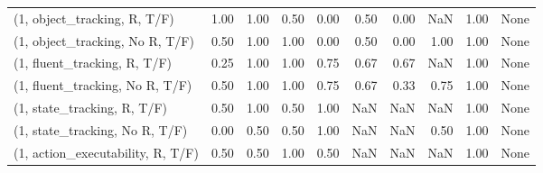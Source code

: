 \begin{table*}[h!]
\begin{adjustbox}{width=2\columnwidth,center}
\begin{tabular}{lrrr|rrr|rrr}
\midrule
(1, object\_tracking, R, T/F)         &                      1.00 &                  1.00 &                      0.50 &                          0.00 &                      0.50 &                          0.00 &                                    NaN &                               1.00 &                                  None \\
(1, object\_tracking, No R, T/F)      &                      0.50 &                  1.00 &                      1.00 &                          0.00 &                      0.50 &                          0.00 &                                   1.00 &                               1.00 &                                  None \\
(1, fluent\_tracking, R, T/F)         &                      0.25 &                  1.00 &                      1.00 &                          0.75 &                      0.67 &                          0.67 &                                    NaN &                               1.00 &                                  None \\
(1, fluent\_tracking, No R, T/F)      &                      0.50 &                  1.00 &                      1.00 &                          0.75 &                      0.67 &                          0.33 &                                   0.75 &                               1.00 &                                  None \\
(1, state\_tracking, R, T/F)          &                      0.50 &                  1.00 &                      0.50 &                          1.00 &                       NaN &                           NaN &                                    NaN &                               1.00 &                                  None \\
(1, state\_tracking, No R, T/F)       &                      0.00 &                  0.50 &                      0.50 &                          1.00 &                       NaN &                           NaN &                                   0.50 &                               1.00 &                                  None \\
(1, action\_executability, R, T/F)    &                      0.50 &                  0.50 &                      1.00 &                          0.50 &                       NaN &                           NaN &                                    NaN &                               1.00 &                                  None \\

\end{tabular}
\end{adjustbox}
\end{table*}

